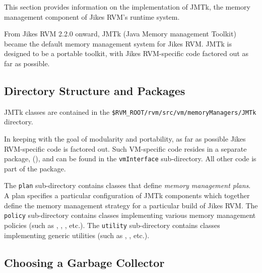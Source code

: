 
This section provides information on the implementation of JMTk, the
memory management component of Jikes\TMweb{} RVM's runtime system.

From Jikes RVM 2.2.0 onward, JMTk (Java Memory management
Toolkit) became the default memory management system for Jikes RVM.
JMTk is designed to be a portable toolkit, with Jikes
RVM-specific code factored out as far as possible.

\subsection{Directory Structure and Packages} \label{sssec:directories}

JMTk classes are contained in the
\texttt{\$RVM\_ROOT/rvm/src/vm/memoryManagers/JMTk} directory.

In keeping with the goal of modularity and portability, as far as
possible Jikes RVM-specific code is factored out.  Such VM-specific
code resides in a separate package,
(),
and can be found in the \texttt{vmInterface} sub-directory.  All other
code is part of the
package.

The \texttt{plan} sub-directory contains classes that define
\emph{memory management plans}.  A plan specifies a particular
configuration of JMTk components which together define the memory
management strategy for a particular build of Jikes RVM.  The
\texttt{policy} sub-directory contains classes implementing various
memory management policies (such as , , , etc.).  The \texttt{utility}
sub-directory contains classes implementing generic utilities (such as
,
, etc.).

\subsection{Choosing a Garbage Collector} \label{ssec:choosinggc}

